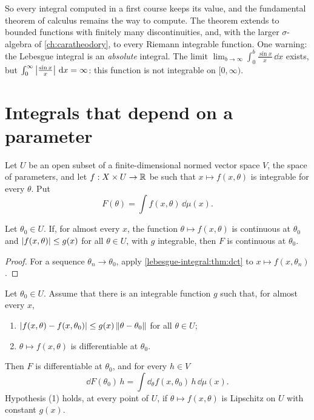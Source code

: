 \begin{notechapter}
So every integral computed in a first course keeps its value, and the
fundamental theorem of calculus remains the way to compute. The theorem
extends to bounded functions with finitely many discontinuities, and,
with the larger $\sigma$-algebra of \cref{ch:caratheodory}, to every
Riemann integrable function. One warning: the Lebesgue integral is an
\emph{absolute} integral. The limit
$\lim_{b\to\infty}\int_0^b\frac{\sin x}x\,\dd x$ exists, but
$\int_0^\infty\left|\frac{\sin x}x\right|\,\mathrm{d} x = \infty$: this function is not
integrable on $[0, \infty)$.

\section{Integrals that depend on a parameter}
\label{lebesgue-integral:sec:parameter}

Let $U$ be an open subset of a finite-dimensional normed vector space
$V$, the space of parameters, and let $f:X\times U\to\mathbb{R}$ be such that
$x\mapsto f(x, \theta)$ is integrable for every $\theta$. Put
\[
  F(\theta) = \int f(x, \theta)\,\dd\mu(x) .
\]

\begin{theorem}[Continuity]\label{lebesgue-integral:thm:continuity}
Let $\theta_0\in U$. If, for almost every $x$, the function
$\theta\mapsto f(x, \theta)$ is continuous at $\theta_0$ and
$\left|f(x, \theta)\right|\leq g(x)$ for all $\theta\in U$, with $g$
integrable, then $F$ is continuous at $\theta_0$.
\end{theorem}

\begin{proof}
For a sequence $\theta_n\to\theta_0$, apply
\cref{lebesgue-integral:thm:dct} to $x\mapsto f(x, \theta_n)$.
\end{proof}

\begin{theorem}
\label{lebesgue-integral:thm:differentiation}
Let $\theta_0\in U$. Assume that there is an integrable function $g$
such that, for almost every $x$,
\begin{enumerate}[nosep]
  \item $\left|f(x, \theta) - f(x, \theta_0)\right|
        \leq g(x)\left\|\theta - \theta_0\right\|$ for all $\theta\in U$;
  \item $\theta\mapsto f(x, \theta)$ is differentiable at $\theta_0$.
\end{enumerate}
Then $F$ is differentiable at $\theta_0$, and for every $h\in V$
\[
  \dd F(\theta_0)\,h = \int\dd_\theta f(x, \theta_0)\,h\,\dd\mu(x) .
\]
Hypothesis (1) holds, at every point of $U$, if
$\theta\mapsto f(x, \theta)$ is Lipschitz on $U$ with constant $g(x)$.
\end{theorem}


\end{notechapter}

